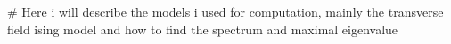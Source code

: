 # Here i will describe the models i used for computation, mainly the transverse field ising model and how to find the spectrum and maximal eigenvalue

